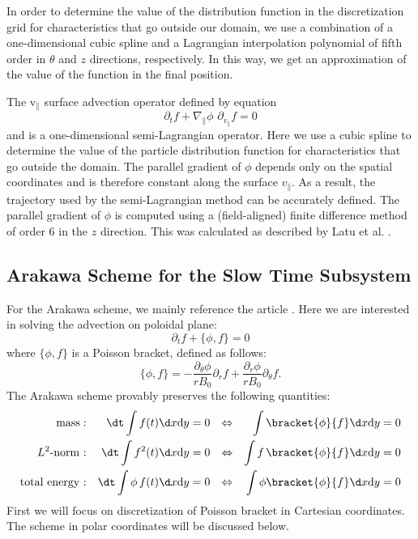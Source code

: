 In order to determine the value of the distribution function in the discretization grid for characteristics that go outside our domain, we use a combination of a one-dimensional cubic spline and a Lagrangian interpolation polynomial of fifth order in $\theta$ and $z$ directions, respectively. In this way, we get an approximation of the value of the function in the final position.

The v$_\parallel$ surface advection operator defined by equation
\begin{equation}
    \partial_t f + \nabla_\parallel \phi\,\, \partial_{v_{\parallel}} f = 0
\end{equation}
and is a one-dimensional semi-Lagrangian operator. Here we use a cubic spline to determine the value of the particle distribution function for characteristics that go outside the domain. The parallel gradient of $\phi$ depends only on the spatial coordinates and is therefore constant along the surface $v_\parallel$. As a result, the trajectory used by the semi-Lagrangian method can be accurately defined. The parallel gradient of $\phi$ is computed using a (field-aligned) finite difference method of order 6 in the $z$ direction. This was calculated as described by Latu et al. \cite{Latu_2017}.







\subsection{Arakawa Scheme for the Slow Time Subsystem}

For the Arakawa scheme, we mainly reference the article \cite{Arakawa_1966}. Here we are interested in solving the advection on poloidal plane:
\begin{equation}
 \partial_t f + \{\phi, f\} = 0
\end{equation}
where $\{\phi,f\}$ is a Poisson bracket, defined as follows:
\begin{equation}
 \{\phi,f\}=-\frac{\partial_\theta\phi}{rB_0}\partial_r f + \frac{\partial_r\phi}{rB_0}\partial_\theta f.
 \label{eq:poisson_bracket}
\end{equation}
The Arakawa scheme provably preserves the following quantities:
	\begin{align}\label{conservation-properties}
		\text{mass} : && \dt \int f(t) \d x \text{d} y & = 0 & \Leftrightarrow && \int\bracket{\phi}{f} \d x \text{d} y & = 0\\
		L^2\text{-norm :} && \dt \int f^2(t) \d x \text{d} y & = 0 & \Leftrightarrow && \int f \, \bracket{\phi}{f} \d x \text{d} y & = 0\\
		\text{total energy :} && \dt \int \phi \, f(t) \d x \text{d} y & = 0 & \Leftrightarrow && \int \phi \bracket{\phi}{f} \d x \text{d} y & = 0
	\end{align}
First we will focus on discretization of Poisson bracket in Cartesian coordinates. The scheme in polar coordinates will be discussed below.








